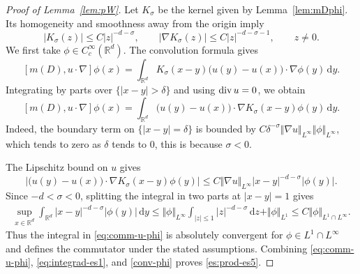 \documentclass[reqno,11pt,a4paper]{amsart}
\newcommand{\R}{\ensuremath{\mathbb{R}}}
\newcommand{\dd}{\mathrm{d}}
\renewcommand{\div}{{\rm div\,}}
\begin{document}
\begin{proof}[Proof of Lemma~\ref{lem:pW}]
Let $K_\sigma$ be the kernel given by
Lemma~\ref{lem:mDphi}. Its homogeneity and smoothness
away from the origin imply
\[
  |K_\sigma(z)|\leq C|z|^{-d-\sigma},
  \qquad
  |\nabla K_\sigma(z)|
  \leq C|z|^{-d-\sigma-1},
  \qquad z\ne0.
\]
We first take $\phi\in C_c^\infty(\R^d)$.
The convolution formula gives
\[
  [m(D),u\cdot\nabla]\phi(x)
  =
  \int_{\R^d}K_\sigma(x-y)
  \bigl(u(y)-u(x)\bigr)\cdot\nabla\phi(y)\,\dd y.
\]
Integrating by parts over $\{|x-y|>\delta\}$
and using $\div u=0$, we obtain
\begin{equation}\label{eq:comm-u-phi}
  [m(D),u\cdot\nabla]\phi(x)
  =
  \int_{\R^d}
  \bigl(u(y)-u(x)\bigr)\cdot
  \nabla K_\sigma(x-y)\phi(y)\,\dd y.
\end{equation}
Indeed, the boundary term on $\{|x-y|=\delta\}$
is bounded by
$C\delta^{-\sigma} \Vert \nabla u\Vert _{L^\infty}\Vert \phi\Vert _{L^\infty}$,
which tends to zero as $\delta$ tends to 0, this is
because $\sigma<0$.

The Lipschitz bound on $u$ gives
\begin{equation}\label{eq:integrad-es1}
  \bigl|
  \bigl(u(y)-u(x)\bigr)\cdot
  \nabla K_\sigma(x-y)\phi(y)
  \bigr|
  \leq
  C\Vert \nabla u\Vert _{L^\infty}
  |x-y|^{-d-\sigma}|\phi(y)|.
\end{equation}
Since $-d<\sigma<0$, splitting the integral in two parts
at $|x-y|=1$ gives
\begin{equation}\label{conv-phi}
\begin{aligned}
  \sup_{x\in\R^d}
  \int_{\R^d}|x-y|^{-d-\sigma}|\phi(y)|\,\dd y
  \leq
  \Vert \phi\Vert _{L^\infty}
  \int_{|z|\leq1}|z|^{-d-\sigma}\,\dd z
  +\Vert \phi\Vert _{L^1}
  \leq C\Vert \phi\Vert _{L^1\cap L^\infty}.
\end{aligned}
\end{equation}
Thus the integral in \eqref{eq:comm-u-phi}
is absolutely convergent for $\phi\in L^1\cap L^\infty$
and defines the commutator under the stated assumptions.
Combining \eqref{eq:comm-u-phi},
\eqref{eq:integrad-es1}, and \eqref{conv-phi}
proves \eqref{es:prod-es5}.


\end{proof}
\end{document}
